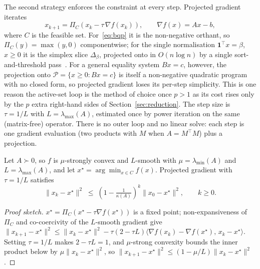 The second strategy enforces the constraint at every step. Projected gradient iterates
\[
  x_{k+1} = \Pi_C\!\left(x_k - \tau\,\nabla f(x_k)\right),
  \qquad \nabla f(x) = A x - b,
\]
where $C$ is the feasible set. For~\eqref{eq:bqp} it is the non-negative orthant, so
$\Pi_C(y) = \max(y, 0)$ componentwise; for the single normalisation $\mathbf{1}^\top x=\beta$,
$x\geq0$ it is the simplex slice $\Delta_\beta$, projected onto in $O(n\log n)$ by a single
sort-and-threshold pass~\cite{duchi2008,condat2016}. For a general equality system $Bx=c$,
however, the projection onto $\mathcal{P} = \{x\geq0: Bx=c\}$ is itself a non-negative
quadratic program with no closed form, so projected gradient loses its per-step simplicity.
This is one reason the active-set loop is the method of choice once $p>1$ as its cost rises only
by the $p$ extra right-hand sides of Section~\ref{sec:reduction}. The step size is $\tau = 1/L$ with
$L = \lambda_{\max}(A)$, estimated once by power iteration on the same (matrix-free) operator.
There is no outer loop and no linear solve: each step is one gradient evaluation (two products
with $M$ when $A = M^\top M$) plus a projection.

\begin{proposition}\label{prop:proj}
  Let $A \succ 0$, so $f$ is $\mu$-strongly convex and $L$-smooth with
  $\mu = \lambda_{\min}(A)$ and $L = \lambda_{\max}(A)$, and let
  $x^\star = \arg\min_{x \in C} f(x)$. Projected gradient with $\tau = 1/L$ satisfies
  \[
    \|x_k - x^\star\|^2 \;\leq\; \left(1 - \tfrac{1}{\kappa(A)}\right)^{\!k}\|x_0 - x^\star\|^2,
    \qquad k \geq 0.
  \]
\end{proposition}
\begin{proof}[Proof sketch]
$x^\star = \Pi_C(x^\star - \tau\nabla f(x^\star))$ is a fixed point; non-expansiveness of
$\Pi_C$ and co-coercivity of the $L$-smooth gradient give
$\|x_{k+1}-x^\star\|^2 \le \|x_k-x^\star\|^2 - \tau(2-\tau L)\langle \nabla f(x_k)-\nabla f(x^\star),\,x_k-x^\star\rangle$.
Setting $\tau = 1/L$ makes $2-\tau L = 1$, and $\mu$-strong convexity bounds the inner product
below by $\mu\|x_k-x^\star\|^2$, so $\|x_{k+1}-x^\star\|^2 \le (1-\mu/L)\|x_k-x^\star\|^2$.
\end{proof}

